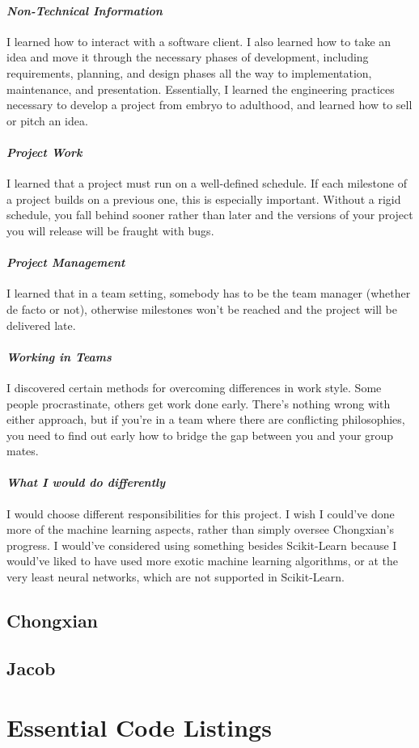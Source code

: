 \documentclass[onecolumn, draftclsnofoot,10pt, compsoc]{IEEEtran}
\begin{document}
\paragraph{\emph{Non-Technical Information}}
I learned how to interact with a software client. I also learned how to take an idea and move it through the necessary phases of development, including requirements, planning, and design phases all the way to implementation, maintenance, and presentation. Essentially, I learned the engineering practices necessary to develop a project from embryo to adulthood, and learned how to sell or pitch an idea.
\paragraph{\emph{Project Work}}
I learned that a project must run on a well-defined schedule. If each milestone of a project builds on a previous one, this is especially important. Without a rigid schedule, you fall behind sooner rather than later and the versions of your project you will release will be fraught with bugs. 

\paragraph{\emph{Project Management}}
I learned that in a team setting, somebody has to be the team manager (whether de facto or not), otherwise milestones won't be reached and the project will be delivered late. 

\paragraph{\emph{Working in Teams}}
I discovered certain methods for overcoming differences in work style. Some people procrastinate, others get work done early. There’s nothing wrong with either approach, but if you’re in a team where there are conflicting philosophies, you need to find out early how to bridge the gap between you and your group mates.

\paragraph{\emph{What I would do differently}}
I would choose different responsibilities for this project. I wish I could’ve done more of the machine learning aspects, rather than simply oversee Chongxian’s progress. I would’ve considered using something besides Scikit-Learn  because I would’ve liked to have used more exotic machine learning algorithms, or at the very least neural networks, which are not supported in Scikit-Learn.


\subsection{Chongxian}
\subsection{Jacob}

\appendices
\section{Essential Code Listings}
\label{EssentialCodeListings}
\end{document}
